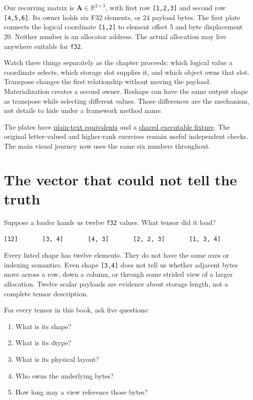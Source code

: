 Our recurring matrix is \(\mathbf{A}\in\mathbb{R}^{2\times3}\), with
first row \texttt{{[}1,2,3{]}} and second row \texttt{{[}4,5,6{]}}. Its
owner holds six F32 elements, or 24 payload bytes. The first plate
connects the logical coordinate \texttt{{[}1,2{]}} to element offset 5
and byte displacement 20. Neither number is an allocator address. The
actual allocation may live anywhere suitable for \texttt{f32}.

Watch three things separately as the chapter proceeds: which logical
value a coordinate selects, which storage slot supplies it, and which
object owns that slot. Transpose changes the first relationship without
moving the payload. Materialization creates a second owner. Reshape can
have the same output shape as transpose while selecting different
values. Those differences are the mechanism, not details to hide under a
framework method name.

The plates have
\href{https://github.com/hermonai/inside-the-llm-engine/blob/astra-visual-rewrite/figures/chapter05-atlas.md}{plain-text
equivalents} and a
\href{https://github.com/hermonai/inside-the-llm-engine/blob/astra-visual-rewrite/code/reference/fixtures/chapter05-visual.json}{shared
executable fixture}. The original letter-valued and higher-rank
exercises remain useful independent checks. The main visual journey now
uses the same six numbers throughout.

\section{The vector that could not tell the
truth}\label{the-vector-that-could-not-tell-the-truth}

Suppose a loader hands us twelve \texttt{f32} values. What tensor did it
load?

\begin{verbatim}
[12]       [3, 4]       [4, 3]       [2, 2, 3]       [1, 3, 4]
\end{verbatim}

Every listed shape has twelve elements. They do not have the same axes
or indexing semantics. Even shape \texttt{{[}3,4{]}} does not tell us
whether adjacent bytes move across a row, down a column, or through some
strided view of a larger allocation. Twelve scalar payloads are evidence
about storage length, not a complete tensor description.

For every tensor in this book, ask five questions:

\begin{enumerate}
\def\labelenumi{\arabic{enumi}.}
\tightlist
\item
  What is its shape?
\item
  What is its dtype?
\item
  What is its physical layout?
\item
  Who owns the underlying bytes?
\item
  How long may a view reference those bytes?
\end{enumerate}

